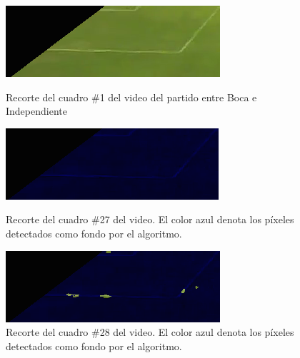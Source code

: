 \begin{figure}[H]
  \centering
    \begin{minipage}[t]{.45\textwidth}
      \includegraphics[width=\linewidth]{./images/tanos-fondo-f1.png}
      \caption{Recorte del cuadro \#1 del video del partido entre Boca e Independiente
      \label{fig:tanos-fondo-sin}}
    \end{minipage}
    \begin{minipage}[t]{.45\textwidth}
      \includegraphics[width=\linewidth]{./images/tanos-fondo-f27.png}
      \caption{Recorte del cuadro \#27 del video. El color azul denota los píxeles detectados como fondo por el algoritmo.
      \label{fig:tanos-fondo}}
    \end{minipage}
    \begin{minipage}[t]{.45\textwidth}
      \centering
      \includegraphics[width=\linewidth]{./images/tanos-fondo-f28.png}
      \caption{Recorte del cuadro \#28 del video. El color azul denota los píxeles detectados como fondo por el algoritmo.
      \label{fig:tanos-fondo-broken}}
    \end{minipage}
\end{figure}

